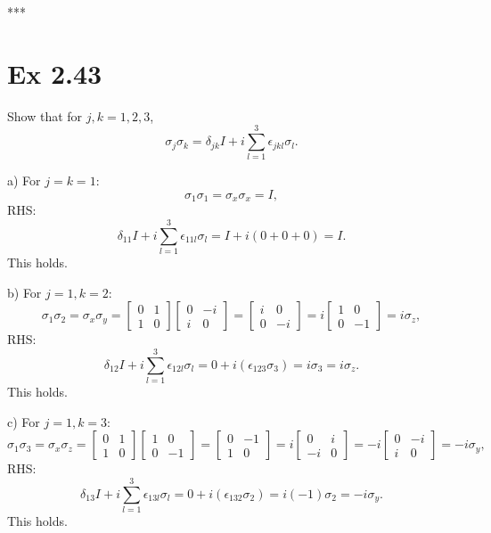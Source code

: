 \documentclass{article}
\newcommand{\0}{{$|0\rangle$}}
\newcommand{\1}{{$|1\rangle$}}
\begin{document}
***

\newpage
\section*{Ex 2.43 } 
Show that for $j,k=1,2,3$,  
$$
\sigma_j \sigma_k = \delta_{jk} I + i \sum_{l=1}^3 \epsilon_{jkl} \sigma_l.
$$

a) For $j=k=1$:  
$$
\sigma_1 \sigma_1 = \sigma_x \sigma_x = I,
$$
RHS:  
$$
\delta_{11} I + i \sum_{l=1}^3 \epsilon_{11l} \sigma_l = I + i(0+0+0) = I.
$$
This holds.

b) For $j=1, k=2$:  
$$
\sigma_1 \sigma_2 = \sigma_x \sigma_y = \begin{bmatrix} 0 & 1 \\ 1 & 0 \end{bmatrix} \begin{bmatrix} 0 & -i \\ i & 0 \end{bmatrix} = \begin{bmatrix} i & 0 \\ 0 & -i \end{bmatrix} = i \begin{bmatrix} 1 & 0 \\ 0 & -1 \end{bmatrix} = i \sigma_z,
$$
RHS:  
$$
\delta_{12} I + i \sum_{l=1}^3 \epsilon_{12l} \sigma_l = 0 + i(\epsilon_{123} \sigma_3) = i \sigma_3 = i \sigma_z.
$$
This holds.

c) For $j=1, k=3$:  
$$
\sigma_1 \sigma_3 = \sigma_x \sigma_z = \begin{bmatrix} 0 & 1 \\ 1 & 0 \end{bmatrix} \begin{bmatrix} 1 & 0 \\ 0 & -1 \end{bmatrix} = \begin{bmatrix} 0 & -1 \\ 1 & 0 \end{bmatrix} = i \begin{bmatrix} 0 & i \\ -i & 0 \end{bmatrix} = -i \begin{bmatrix} 0 & -i \\ i & 0 \end{bmatrix} = -i \sigma_y,
$$
RHS:  
$$
\delta_{13} I + i \sum_{l=1}^3 \epsilon_{13l} \sigma_l = 0 + i(\epsilon_{132} \sigma_2) = i(-1) \sigma_2 = -i \sigma_y.
$$
This holds.
\end{document}
